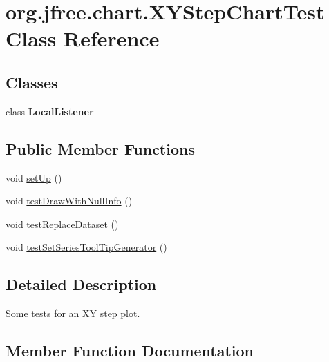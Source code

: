 \hypertarget{classorg_1_1jfree_1_1chart_1_1_x_y_step_chart_test}{}\section{org.\+jfree.\+chart.\+X\+Y\+Step\+Chart\+Test Class Reference}
\label{classorg_1_1jfree_1_1chart_1_1_x_y_step_chart_test}
\subsection*{Classes}
\begin{DoxyCompactItemize}
\item 
class {\bfseries Local\+Listener}
\end{DoxyCompactItemize}
\subsection*{Public Member Functions}
\begin{DoxyCompactItemize}
\item 
void \mbox{\hyperlink{classorg_1_1jfree_1_1chart_1_1_x_y_step_chart_test_a7fd3276ea828b495493555de628423e5}{set\+Up}} ()
\item 
void \mbox{\hyperlink{classorg_1_1jfree_1_1chart_1_1_x_y_step_chart_test_a0856c59d03e45bbe34d12fb05fcdec52}{test\+Draw\+With\+Null\+Info}} ()
\item 
void \mbox{\hyperlink{classorg_1_1jfree_1_1chart_1_1_x_y_step_chart_test_a6c108a243531762f6846d80cfd92ae3e}{test\+Replace\+Dataset}} ()
\item 
void \mbox{\hyperlink{classorg_1_1jfree_1_1chart_1_1_x_y_step_chart_test_ac6ebe864ff33d1c79170614fbf5cd061}{test\+Set\+Series\+Tool\+Tip\+Generator}} ()
\end{DoxyCompactItemize}


\subsection{Detailed Description}
Some tests for an XY step plot. 

\subsection{Member Function Documentation}
\mbox{\label{classorg_1_1jfree_1_1chart_1_1_x_y_step_chart_test_a7fd3276ea828b495493555de628423e5}} 
